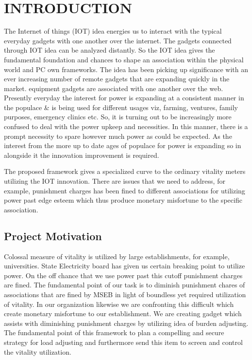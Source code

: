 \documentclass[12pt,a4paper]{article}
\begin{document}
\newpage
\setcounter{page}{1}
\pagebreak
\vspace*{\fill}%
\noindent
{}
\vfill

\newpage
\section{INTRODUCTION}
\fancyfoot[R]{\thepage}

\hspace{0.5cm}The Internet of things (IOT) idea energies us to interact with the typical everyday gadgets with one another over the internet. The gadgets connected through IOT idea can be analyzed distantly. So the IOT idea gives the fundamental foundation and chances to shape an association within the physical world and PC own frameworks. The idea has been picking up significance with an ever increasing number of remote gadgets that are expanding quickly in the market. equipment gadgets are associated with one another over the web. \\

Presently everyday the interest for power is expanding at a consistent manner in the populace \& is being used for different usages viz, farming, ventures, family purposes, emergency clinics etc. So, it is turning out to be increasingly more confused to deal with the power upkeep and necessities. In this manner, there is a prompt necessity to spare however much power as could be expected. As the interest from the more up to date ages of populace for power is expanding so in alongside it the innovation improvement is required. 

The proposed framework gives a specialized curve to the ordinary vitality meters utilizing the IOT innovation. There are issues that we need to address, for example, punishment charges has been fined to different associations for utilizing power past edge esteem which thus produce monetary misfortune to the specific association.

\subsection{Project Motivation}
\hspace{0.5cm} Colossal measure of vitality is utilized by large establishments, for example, universities. State Electricity board has given us certain breaking point to utilize power. On the off chance that we use power past this cutoff punishment charges are fined. The fundamental point of our task is to diminish punishment chares of associations that are fined by MSEB in light of boundless yet required utilization of vitality. In our organization likewise we are confronting this difficult which create monetary misfortune to our establishment. We are creating gadget which assists with diminishing punishment charges by utilizing idea of burden adjusting. The fundamental point of this framework to plan a compelling and secure strategy for load adjusting and furthermore send this item to screen and control the vitality utilization.
\end{document}
